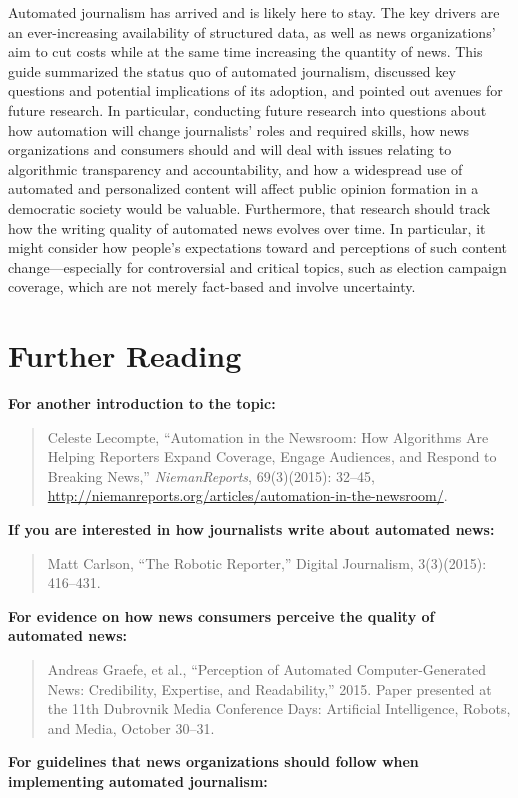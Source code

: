\documentclass[notoc, symmetric, nobib, nols]{towcenter-guideto-book}
\begin{document}
Automated journalism has arrived and is likely here to stay. The key drivers are an ever-increasing availability of structured data, as well as news organizations' aim to cut costs while at the same time increasing the quantity of news. This guide summarized the status quo of automated journalism, discussed key questions and potential implications of its adoption, and pointed out avenues for future research. In particular, conducting future research into questions about how automation will change journalists' roles and required skills, how news organizations and consumers should and will deal with issues relating to algorithmic transparency and accountability, and how a widespread use of automated and personalized content will affect public opinion formation in a democratic society would be valuable. Furthermore, that research should track how the writing quality of automated news evolves over time. In particular, it might consider how people's expectations toward and perceptions of such content change---especially for controversial and critical topics, such as election campaign coverage, which are not merely fact-based and involve uncertainty.

\chapter{Further Reading}

\noindent\textbf{For another introduction to the topic:}

\begin{quote}Celeste Lecompte, ``Automation in the Newsroom: How Algorithms Are Helping Reporters Expand Coverage, Engage Audiences, and Respond to Breaking News,'' \textit{NiemanReports}, 69(3)(2015): 32--45, \href{http://niemanreports.org/articles/automation-in-the-newsroom/}{http://niemanreports.org/articles/automation-in-the-newsroom/}. 
\end{quote}

\noindent\textbf{If you are interested in how journalists write about automated news:}

\begin{quote}Matt Carlson, ``The Robotic Reporter,'' Digital Journalism, 3(3)(2015): 416--431. 
\end{quote}

\noindent\textbf{For evidence on how news consumers perceive the quality of automated news:}

\begin{quote}Andreas Graefe, et al., ``Perception of Automated Computer-Generated News: Credibility, Expertise, and Readability,'' 2015. Paper presented at the 11th Dubrovnik Media Conference Days: Artificial Intelligence, Robots, and Media, October 30--31. 
\end{quote}
\noindent\textbf{For guidelines that news organizations should follow when implementing automated journalism:}
\end{document}
